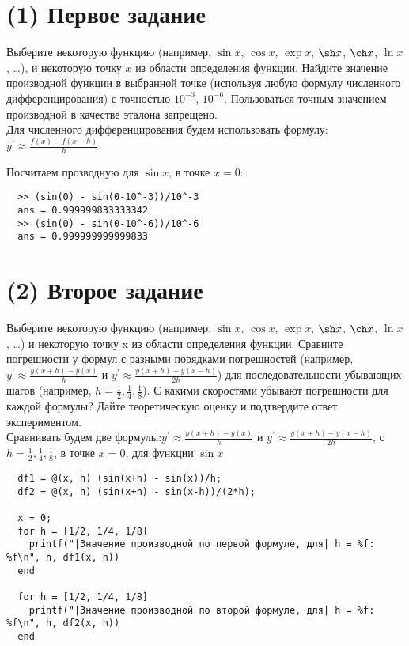 \maketitle
\tableofcontents
\newpage
\section{(1) Первое задание}
Выберите некоторую функцию (например, $\sin x$, $\cos x$, $\exp x$, $\sh x$, $\ch x$, $\ln x$, \ldots), и некоторую точку $x$ из области определения функции. Найдите значение производной функции в выбранной точке (используя любую формулу численного дифференцирования) с точностью $10^{-3}$, $10^{-6}$. Пользоваться точным значением производной в качестве эталона запрещено.\\[5mm]

Для численного дифференцирования будем использовать формулу: $y^{'} \approx \frac{f(x) - f(x-h)}{h}$.

Посчитаем прозводную для $\sin x$, в точке $x = 0$:
\begin{lstlisting}
  >> (sin(0) - sin(0-10^-3))/10^-3
  ans = 0.999999833333342
  >> (sin(0) - sin(0-10^-6))/10^-6
  ans = 0.999999999999833
\end{lstlisting}

\section{(2) Второе задание}
Выберите некоторую функцию (например, $\sin x$, $\cos x$, $\exp x$, $\sh x$, $\ch x$, $\ln x$, \ldots) и некоторую точку x из области определения функции. Сравните погрешности у формул с разными порядками погрешностей (например, $y^{'} \approx \frac{y(x+h) - y(x)}{h}$ и $y^{'} \approx \frac{y(x+h) - y(x-h)}{2h}$) для последовательности убывающих шагов (например, $h = \frac{1}{2}, \frac{1}{4}, \frac{1}{8}$). С какими скоростями убывают погрешности для каждой формулы? Дайте теоретическую оценку и подтвердите ответ экспериментом.\\[5mm]

Сравнивать будем две формулы:$y^{'} \approx \frac{y(x+h) - y(x)}{h}$ и $y^{'} \approx \frac{y(x+h) - y(x-h)}{2h}$, с $h = \frac{1}{2}, \frac{1}{4}, \frac{1}{8}$, в точке $x = 0$, для функции $\sin x$

\begin{lstlisting}
  df1 = @(x, h) (sin(x+h) - sin(x))/h;
  df2 = @(x, h) (sin(x+h) - sin(x-h))/(2*h);

  x = 0;
  for h = [1/2, 1/4, 1/8]
    printf("|Значение производной по первой формуле, для| h = %f: %f\n", h, df1(x, h))
  end

  for h = [1/2, 1/4, 1/8]
    printf("|Значение производной по второй формуле, для| h = %f: %f\n", h, df2(x, h))
  end
\end{lstlisting}

